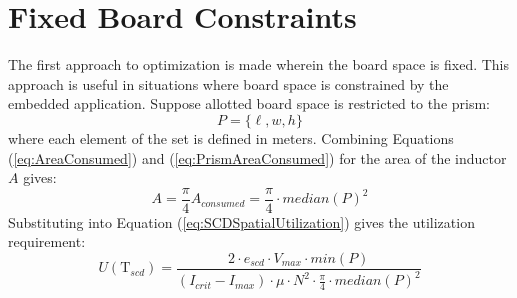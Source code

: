 \documentclass[11pt,compsoc,oneside]{report}
\begin{document}
\section{Fixed Board Constraints}

The first approach to optimization is made wherein the board space is fixed. This approach is useful in situations where board space is constrained by the embedded application. Suppose allotted board space is restricted to the prism:
\begin{equation}\label{eq:Prism2}
P = \{\ell, w, h\} \nonumber
\end{equation}
where each element of the set is defined in meters. Combining Equations (\ref{eq:AreaConsumed}) and (\ref{eq:PrismAreaConsumed}) for the area of the inductor $A$ gives:
\begin{equation}\label{eq:InductorAreaPrism}
A = \frac{\pi}{4} A_{consumed} = \frac{\pi}{4} \cdot median(P)^2 \nonumber
\end{equation}
Substituting into Equation (\ref{eq:SCDSpatialUtilization}) gives the utilization requirement:
\begin{equation}\label{eq:MinUtilizationPrism}
U(\mathrm{T}_{scd}) = \frac{2 \cdot e_{scd} \cdot V_{max} \cdot min(P)}{(I_{crit}-I_{max}) \cdot \mu \cdot N^{2} \cdot \frac{\pi}{4} \cdot median(P)^2}
\end{equation}
\end{document}
